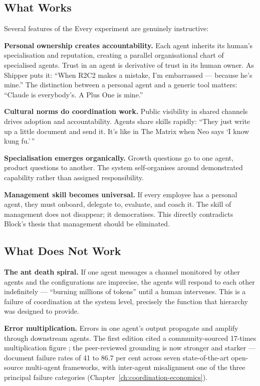\subsection{What Works}

Several features of the Every experiment are genuinely instructive:

\textbf{Personal ownership creates accountability.} Each agent inherits its human's specialisation and reputation, creating a parallel organisational chart of specialised agents. Trust in an agent is derivative of trust in its human owner. As Shipper puts it: ``When R2C2 makes a mistake, I'm embarrassed --- because he's mine.'' The distinction between a personal agent and a generic tool matters: ``Claude is everybody's. A Plus One is mine.''

\textbf{Cultural norms do coordination work.} Public visibility in shared channels drives adoption and accountability. Agents share skills rapidly: ``They just write up a little document and send it. It's like in The Matrix when Neo says `I know kung fu.'\,''

\textbf{Specialisation emerges organically.} Growth questions go to one agent, product questions to another. The system self-organises around demonstrated capability rather than assigned responsibility.

\textbf{Management skill becomes universal.} If every employee has a personal agent, they must onboard, delegate to, evaluate, and coach it. The skill of management does not disappear; it democratises. This directly contradicts Block's thesis that management should be eliminated.

\subsection{What Does Not Work}

\textbf{The ant death spiral.} If one agent messages a channel monitored by other agents and the configurations are imprecise, the agents will respond to each other indefinitely --- ``burning millions of tokens'' until a human intervenes. This is a failure of coordination at the system level, precisely the function that hierarchy was designed to provide.

\textbf{Error multiplication.} Errors in one agent's output propagate and amplify through downstream agents. The first edition cited a community-sourced 17-times multiplication figure \parencite{TDS2026}; the peer-reviewed grounding is now stronger and starker --- \textcite{Cemri2025} document failure rates of 41 to 86.7 per cent across seven state-of-the-art open-source multi-agent frameworks, with inter-agent misalignment one of the three principal failure categories (Chapter~\ref{ch:coordination-economics}).

